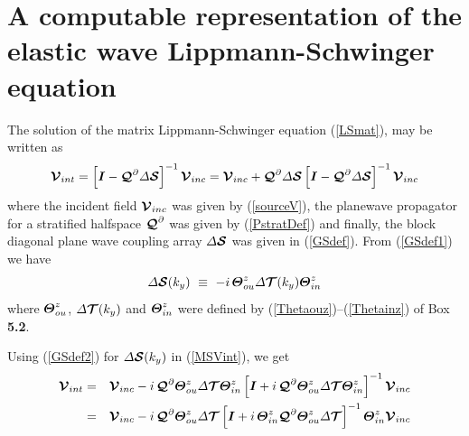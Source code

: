 \section{A computable representation of the elastic wave Lippmann-Schwinger equation}

The solution of the matrix Lippmann-Schwinger equation (\ref{LSmat}), may be 
written as
\begin{equation} \label{MSVint}
{\CB  V}_{{int}}
=\left[{\bmi  I} - {\CB Q}^{\partial} {\mit \Delta} {\CB  S}\right]^{-1}
{\CB  V}_{{inc}}
={\CB  V}_{{inc}}+
{\CB Q}^{\partial} {\mit \Delta} {\CB  S}\left[{\bmi I} - 
{\CB Q}^{\partial} {\mit \Delta} {\CB  S}\right]^{-1}
{\CB  V}_{{inc}}
\end{equation}
where the incident field ${\CB  V}_{{inc}}$  was given by (\ref{sourceV}),
the planewave propagator for a stratified halfspace ${\CB Q}^{\partial}$ 
was given by (\ref{PstratDef}) and finally, the block diagonal plane wave 
coupling array ${\mit \Delta} {\CB  S}$ was given in (\ref{GSdef}).
From (\ref{GSdef1}) we have
\begin{equation} \label{GSdef2}
{\mit \Delta}{\CB  S}(k_y) \ \equiv\  -i\, {\bmi \Theta}^{z}_{ou} 
{\mit \Delta}{\CB T}(k_y) {\bmi \Theta}^{z}_{in}
\end{equation}
where ${\bmi \Theta}^{z}_{ou}$, 
${\mit \Delta}{\CB T}(k_y)$ and  ${\bmi \Theta}^{z}_{in}$ were defined by 
(\ref{Thetaouz})--(\ref{Thetainz}) of {\sc Box } {\bf 5.2}.

Using (\ref{GSdef2}) for ${\mit \Delta}{\CB  S}(k_y)$ in (\ref{MSVint}), we get
\begin{eqnarray} \label{MSVint1}
{\CB  V}_{{int}}
&=&{\CB  V}_{{inc}}-i\,
{\CB Q}^{\partial}  {\bmi \Theta}^{z}_{ou} {\mit \Delta}{\CB T}
{\bmi \Theta}^{z}_{in}\left[{\bmi I} + i\, {\CB Q}^{\partial} 
{\bmi \Theta}^{z}_{ou} {\mit \Delta}{\CB T}
{\bmi \Theta}^{z}_{in}\right]^{-1}
{\CB  V}_{{inc}}\nonumber\\
&=&{\CB  V}_{{inc}}-i\,
{\CB Q}^{\partial}  {\bmi \Theta}^{z}_{ou} {\mit \Delta}{\CB T}
\left[{\bmi I} + i\, {\bmi \Theta}^{z}_{in} {\CB Q}^{\partial} 
{\bmi \Theta}^{z}_{ou} {\mit \Delta}{\CB T}
\right]^{-1}
{\bmi \Theta}^{z}_{in}{\CB  V}_{{inc}}
\end{eqnarray}



